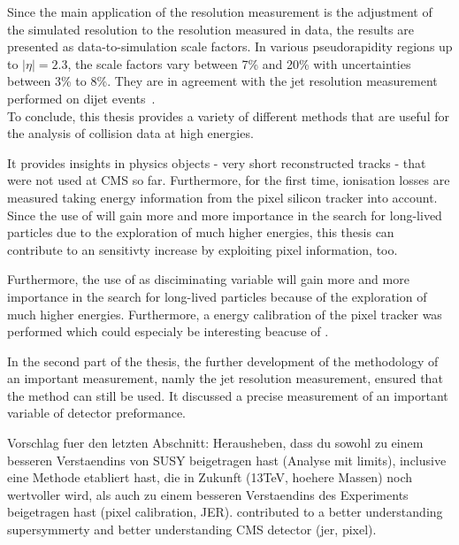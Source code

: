 Since the main application of the resolution measurement is the adjustment of the simulated resolution to the resolution measured in data, the results are presented as data-to-simulation scale factors.
In various pseudorapidity regions up to $|\eta|=2.3$, the scale factors vary between 7\% and 20\% with uncertainties between 3\% to 8\%.
They are in agreement with the jet \pt resolution measurement performed on dijet events~\cite{bib:Kristin_Thesis}.\\

To conclude, this thesis provides a variety of different methods that are useful for the analysis of collision data at high energies.

It provides insights in physics objects - very short reconstructed tracks - that were not used at CMS so far.
Furthermore, for the first time, ionisation losses are measured taking energy information from the pixel silicon tracker into account.
Since the use of \dedx will gain more and more importance in the search for long-lived particles due to the exploration of much higher energies, this thesis can contribute to  an sensitivty increase by exploiting pixel information, too.


Furthermore, the use of \dedx as disciminating variable will gain more and more importance in the search for long-lived particles because of the exploration of much higher energies.
Furthermore, a energy calibration of the pixel tracker was performed which could especialy be interesting beacuse of \dedx. 

In the second part of the thesis, the further development of the methodology of an important measurement, namly the jet \pt resolution measurement, ensured that the method can still be used.
It discussed a precise measurement of an important variable of detector preformance.
 
Vorschlag fuer den letzten Abschnitt:
Herausheben, dass du sowohl zu einem besseren Verstaendins von SUSY beigetragen hast (Analyse mit limits), inclusive eine Methode etabliert hast, die in Zukunft (13TeV, hoehere Massen) noch wertvoller wird, als auch zu einem besseren Verstaendins des Experiments beigetragen hast (pixel calibration, JER).
contributed to a better understanding  supersymmerty and better understanding CMS detector (jer, pixel).




